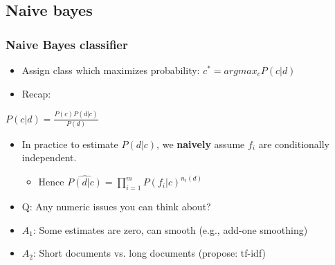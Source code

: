 \documentclass{beamer}
\begin{document}
\subsection{Naive bayes}
\begin{frame}
	\frametitle{Naive Bayes classifier}
	\begin{itemize}
		\item Assign class which maximizes probability: $c^{*}=argmax_{c} P(c|d)$
		\pause
		\item Recap:
	\end{itemize}
	
	\begin{Definition}
		\center
		$P(c|d) = \frac{P(c)P(d|c)}{P(d)}$
	\end{Definition}
	\pause
	\begin{itemize}
		\item In practice to estimate $P(d|c)$, we \textbf{naively} assume $f_i$ are conditionally independent.
		\pause
		\begin{itemize}
			\item Hence $\widehat{P(d|c)}=\prod_{i=1}^{m}P(f_i|c)^{n_i(d)}$ 
		\end{itemize}
		\pause
		\item Q: Any numeric issues you can think about?
		\pause
		\item $A_1$: Some estimates are zero, can smooth (e.g., add-one smoothing) 
		\pause
		\item $A_2$: Short documents vs. long documents (propose: tf-idf)
	\end{itemize}
\end{frame}
\end{document}
